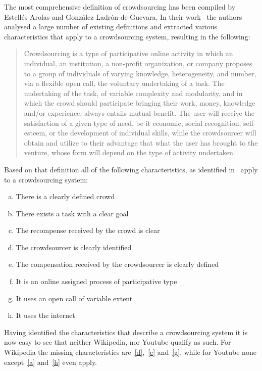 \documentclass{sig-alternate}
\begin{document}
The most comprehensive definition of crowdsourcing has been compiled by
Estell{\'e}s-Arolas and Gonz{\'a}lez-Ladr{\'o}n-de-Guevara. In their
work~\cite{estelles2012towards} the authors analysed a large number of
existing definitions and extracted various characteristics that apply to a
crowdsourcing system, resulting in the following: 
\begin{quotation}
	Crowdsourcing is a type of participative online activity in which an
	individual, an institution, a non-profit organization, or company proposes to
	a group of individuals of varying knowledge, heterogeneity, and number, via a
	flexible open call, the voluntary undertaking of a task. The undertaking of
	the task, of variable complexity and modularity, and in which the crowd should
	participate bringing their work, money, knowledge and/or experience, always
	entails mutual benefit. The user will receive the satisfaction of a given type
	of need, be it economic, social recognition, self-esteem, or the development
	of individual skills, while the crowdsourcer will obtain and utilize to their
	advantage that what the user has brought to the venture, whose form will
	depend on the type of activity undertaken.
\end{quotation}

Based on that definition all of the following characteristics, as identified
in~\cite{estelles2012towards} apply to a crowdsourcing system:

\begin{enumerate}[(a)]
	\item There is a clearly defined crowd\label{a}
	\item There exists a task with a clear goal\label{b}
	\item The recompense received by the crowd is clear\label{c}
	\item The crowdsourcer is clearly identified\label{d}
	\item The compensation received by the crowdsourcer is clearly defined\label{e}
	\item It is an online assigned process of participative type\label{f}
	\item It uses an open call of variable extent\label{g}
	\item It uses the internet\label{h}
\end{enumerate}

Having identified the characteristics that describe a crowdsourcing system it
is now easy to see that neither Wikipedia, nor Youtube qualify as such. For
Wikipedia the missing characteristics are~\ref{d},~\ref{e} and~\ref{g}, while
for Youtube none except~\ref{a} and~\ref{h} even apply.
\end{document}
